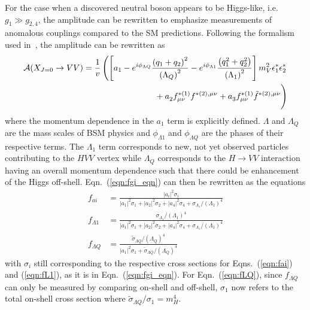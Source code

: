 For the case when a discovered neutral boson appears to be Higgs-like, i.e. $g_1 \gg g_{2,4}$, the amplitude can be rewritten to emphasize measurements of anomalous couplings compared to the SM predictions. Following the formalism used in~\cite{Gao:2010qx,Bolognesi:2012mm,Anderson:2013afp}, the amplitude can be rewritten as
\begin{equation}
\begin{split}
\mathcal{A}(X_{J=0} \rightarrow VV) = \frac{1}{v}\left(\left[ a_{1}  - e^{i\phi_{\Lambda{Q}}} \frac{\left(q_{1} + q_{2}\right)^{2}}{\left(\Lambda_{Q}\right)^{2}} - e^{i\phi_{\Lambda{1}}} \frac{\left(q_{1}^2 + q_{2}^2\right)}{\left(\Lambda_{1}\right)^{2}}\right]m_{V}^2 \epsilon_{1}^*\epsilon_{2}^*   \right. \\
\left. \vphantom{\frac{\left(q_{1} + q_{2}\right)^{2}}{\left(\Lambda_{Q}\right)^{2}}} + a_{2}^{}  f_{\mu \nu}^{*(1)}f^{*(2),\mu\nu} 
+ a_{3}^{}   f^{*(1)}_{\mu \nu} {\tilde f}^{*(2),\mu\nu}\right)
\end{split}
\label{eq:scalarAmpl_wformfactors}
\end{equation}
where the momentum dependence in the $a_1$ term is explicitly defined. $\Lambda$ and $\Lambda_{Q}$ are the mass scales of BSM physics and $\phi_{\Lambda{1}}$ and $\phi_{\Lambda{Q}}$ are the phases of their respective terms. The $\Lambda_1$ term corresponds to new, not yet observed particles contributing to the $HVV$ vertex while $\Lambda_Q$ corresponds to the $H\rightarrow VV$ interaction having an overall momentum dependence such that there could be enhancement of the Higgs off-shell. Eqn.~(\ref{eqn:fgi_eqn}) can then be rewritten as the equations
\begin{align}
f_{ai} &= \frac{|a_i|^2\sigma_i}{|a_1|^2\sigma_1 + |a_2|^2\sigma_2 + |a_4|^2\sigma_4 + \sigma_{\Lambda_{1}}/(\Lambda_1)^4} \label{eqn:fai} \\
f_{\Lambda{1}} &= \frac{\sigma_{\Lambda_{1}}/(\Lambda_1)^4}{|a_1|^2\sigma_1 + |a_2|^2\sigma_2 + |a_4|^2\sigma_4 + \sigma_{\Lambda_{1}}/(\Lambda_1)^4} \label{eqn:fL1} \\
f_{\Lambda{Q}} &= \frac{\tilde{\sigma}_{\Lambda{Q}}/\left(\Lambda_Q\right)^4}{|a_1|^2\sigma_1 + \tilde{\sigma}_{\Lambda{Q}}/\left(\Lambda_Q\right)^4} \label{eqn:fLQ}
\end{align}
with $\sigma_i$ still corresponding to the respective cross sections for Eqns.~(\ref{eqn:fai}) and (\ref{eqn:fL1}), as it is in Eqn.~(\ref{eqn:fgi_eqn}). For Eqn.~(\ref{eqn:fLQ}), since $f_{\Lambda{Q}}$ can only be measured by comparing on-shell and off-shell, $\sigma_1$ now refers to the total on-shell cross section where $\tilde{\sigma}_{\Lambda{Q}}/\sigma_{1}=m_{H}^4$.

